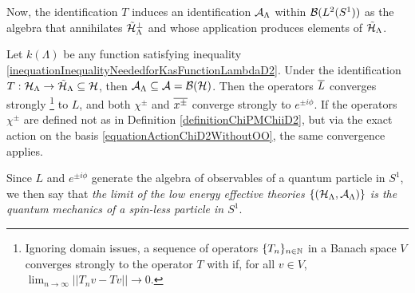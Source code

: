 Now, the identification $T$ induces an identification $\mathcal A_\Lambda$ within $\mathcal B(L^2(S^1))$ as the algebra that annihilates $\tilde {\mathcal H}_\Lambda^\perp$ and whose application produces elements of $\tilde {\mathcal H}_\Lambda$. 

\begin{theorem}\label{theoremConvergesToQMD2}
Let $k(\Lambda)$ be any function satisfying inequality \eqref{inequationInequalityNeededforKasFunctionLambdaD2}. Under the identification $T: \mathcal H_\Lambda \to \tilde {\mathcal H}_\Lambda \subseteq \mathcal H$, then $\mathcal A_\Lambda \subseteq \mathcal A = \mathcal B (\mathcal H)$. Then the operators $\overline{L} $ converges strongly
\footnote{Ignoring domain issues, a sequence of operators $\{T_n\}_{n \in \mathbb{N}}$ in a Banach space $V$ converges strongly to the operator $T$ with if, for all $v \in V$, $\lim_{n \to \infty} ||T_n v - T v|| \to 0$.}
 to $L$, and both $\chi^\pm$ and $\overline{x^\pm}$ converge strongly to $e^{\pm i\phi}$. If the operators $\chi^\pm$ are defined not as in Definition \ref{definitionChiPMChiiD2}, but via the exact action on the basis \eqref{equationActionChiD2WithoutOO}, the same convergence applies.

\noindent Since $L$ and $e^{\pm i \phi}$ generate the algebra of observables of a quantum particle in $S^1$, we then say that \emph{the limit of the low energy effective theories $\{(\mathcal H_\Lambda, \mathcal A_\Lambda)\}$ is the quantum mechanics of a spin-less particle in $S^1$}.

\end{theorem}

